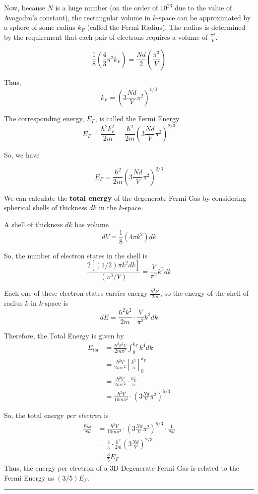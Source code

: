\documentclass[twoside]{article}
\begin{document}
Now, because $N$ is a huge number (on the order of $10^{23}$ due to the value of Avogadro's constant), the rectangular volume in $k$-space can be approximated by a sphere of some radius $k_F$ (called the Fermi Radius). The radius is determined by the requirement that each pair of electrons requires a volume of $\frac{\pi^3}{V}$.

\[ \frac{1}{8} \left( \frac{4}{3} \pi^2 k_F \right) = \frac{Nd}{2} \left( \frac{\pi^3}{V} \right) \]

Thus,
\[ k_F = \left( 3 \frac{Nd}{V} \pi^2 \right)^{1/3} \]

The corresponding energy, $E_F$, is called the Fermi Energy 
\[ E_F = \frac{\hbar^2 k_F^2}{2m} = \frac{\hbar^2}{2m}\left( 3 \frac{Nd}{V} \pi^2 \right)^{2/3}  \]

So, we have 

\[ \boxed{ E_F = \frac{\hbar^2}{2m}\left( 3 \frac{Nd}{V} \pi^2 \right)^{2/3} } \]
\vskip 1cm

We can calculate the \textbf{total energy} of the degenerate Fermi Gas by considering spherical shells of thickness $dk$ in the $k$-space.

A shell of thickness $dk$ has volume 
\[ dV = \frac{1}{8} \left( 4\pi k^2 \right) dk \]

So, the number of electron states in the shell is 
\[ \frac{2 [(1/2) \pi k^2 dk] }{(\pi^3 / V)} = \frac{V}{\pi^2} k^2 dk \]

Each one of these electron states carries energy $\frac{\hbar^2 k^2}{2m}$, so the energy of the shell of radius $k$ in $k$-space is 
\[ dE = \frac{\hbar^2 k^2}{2m} \cdot \frac{V}{\pi^2} k^2 dk \]

Therefore, the Total Energy is given by 
\begin{align*}
   E_{tot} &= \frac{\hbar^2 k^2 V}{2m \pi^2} \int_{0}^{k_F} k^4 dk \\
   &= \frac{\hbar^2 V}{2m \pi^2} \left[\frac{k^5}{5}\right]_{0}^{k_F} \\
   &= \frac{\hbar^2 V}{2m \pi^2} \cdot \frac{k_F^5}{5} \\
   &= \frac{\hbar^2 V}{10m \pi^2} \cdot \left( 3 \frac{Nd}{V} \pi^2 \right)^{5/3}
\end{align*}

So, the total energy \emph{per electron} is 
\begin{align*}
   \frac{E_{tot} }{Nd} &= \frac{\hbar^2 V}{10m \pi^2} \cdot \left( 3 \frac{Nd}{V} \pi^2 \right)^{5/3} \cdot \frac{1}{Nd} \\
   &= \frac{3}{5} \cdot \frac{\hbar^2}{2m} \left( 3 \frac{Nd}{V} \right)^{2/3} \\
   &= \frac{3}{5} E_F
\end{align*}
Thus, the energy per electron of a 3D Degenerate Fermi Gas is related to the Fermi Energy as $(3/5) E_F$.
\vskip 0.25cm
\hrule
\vskip 1cm
\end{document}
